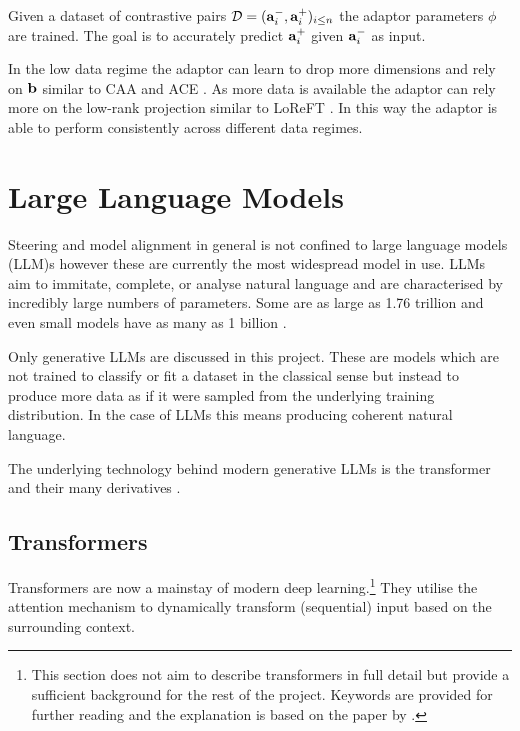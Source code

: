 Given a dataset of contrastive pairs $\mathcal{D} = (\mathbf{a}_i^-, \mathbf{a}_i^+)_{i\le n}$ the adaptor parameters $\phi$ are trained.
The goal is to accurately predict $\mathbf{a}_i^+$ given $\mathbf{a}_i^-$ as input.

In the low data regime the adaptor can learn to drop more dimensions and rely on $\mathbf{b}$ similar to CAA \cite{caa} and ACE \cite{ace}.
As more data is available the adaptor can rely more on the low-rank projection similar to LoReFT \cite{reft}.
In this way the adaptor is able to perform consistently across different data regimes.

\section{Large Language Models}

Steering and model alignment in general is not confined to large language models (LLM)s however these are currently the most widespread model in use.
LLMs aim to immitate, complete, or analyse natural language and are characterised by incredibly large numbers of parameters.
Some are as large as 1.76 trillion \cite{gpt4-count} and even small models have as many as 1 billion \cite{gemma}.

Only generative LLMs are discussed in this project.
These are models which are not trained to classify or fit a dataset in the classical sense but instead to produce more data as if it were sampled from the underlying training distribution.
In the case of LLMs this means producing coherent natural language.

The underlying technology behind modern generative LLMs is the transformer \cite{transformers} and their many derivatives \cite{linear-attention, bigbird, linformer}.

\subsection{Transformers}

Transformers \cite{transformers} are now a mainstay of modern deep learning.\footnote{This section does not aim to describe transformers in full detail but provide a sufficient background for the rest of the project.
Keywords are provided for further reading and the explanation is based on the paper by \citet{turner2023}.}
They utilise the attention mechanism to dynamically transform (sequential) input based on the surrounding context.

